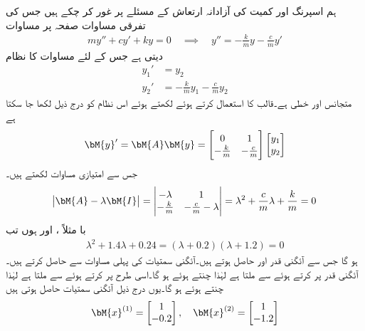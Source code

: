 ہم  اسپرنگ اور کمیت کی آزادانہ ارتعاش  کے مسئلے پر غور کر چکے ہیں جس کی تفرقی مساوات صفحہ  پر مساوات 
\begin{align}
my''+cy'+ky=0 \quad \implies \quad y''=-\frac{k}{m}y-\frac{c}{m}y'
\end{align}
 دیتی ہے جس کے لئے مساوات  کا نظام
\begin{align*}
y_1'&=y_2\\
y_2'&=-\frac{k}{m}y_1-\frac{c}{m}y_2
\end{align*}
 متجانس اور خطی ہے۔قالب کا استعمال کرتے ہوئے  لکھتے ہوئے اس نظام کو درج ذیل لکھا جا سکتا ہے
\begin{align}
\bM{y}'=\bM{A}\bM{y}=\begin{bmatrix} 0 & 1 \\ -\frac{k}{m}& -\frac{c}{m} \end{bmatrix}\begin{bmatrix}  y_1 \\ y_2 \end{bmatrix}
\end{align}
جس سے امتیازی مساوات لکھتے ہیں۔
\begin{align*}
\abs{\bM{A}-\lambda \bM{I}}=\begin{vmatrix} -\lambda & 1\\ -\frac{k}{m}& -\frac{c}{m}-\lambda \end{vmatrix}=\lambda^2+\frac{c}{m}\lambda+\frac{k}{m}=0
\end{align*}
با مثلاً ،  اور  ہوں تب 
\begin{align*}
\lambda^2+1.4\lambda+0.24=(\lambda+0.2)(\lambda+1.2)=0
\end{align*}
ہو گا جس سے آئگنی قدر  اور  حاصل ہوتے ہیں۔آئگنی سمتیات  کی پہلی مساوات  سے حاصل کرتے ہیں۔آئگنی قدر  پر کرتے ہوئے   سے  ملتا ہے لہٰذا  چنتے ہوئے  ہو گا۔اسی طرح  پر کرتے ہوئے  سے  ملتا ہے لہٰذا  چنتے ہوئے  ہو گا۔یوں درج ذیل آئگنی سمتیات حاصل ہوتی ہیں
\begin{align*}
\bM{x}^{(1)}=\begin{bmatrix} 1 \\ -0.2  \end{bmatrix}, \quad \bM{x}^{(2)}=\begin{bmatrix}  1 \\ -1.2 \end{bmatrix}
\end{align*}
